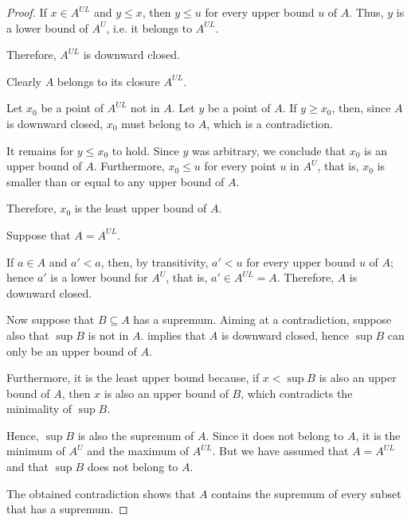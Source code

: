 \begin{proof}
   If \( x \in A^{UL} \) and \( y \leq x \), then \( y \leq u \) for every upper bound \( u \) of \( A \). Thus, \( y \) is a lower bound of \( A^U \), i.e. it belongs to \( A^{UL} \).

  Therefore, \( A^{UL} \) is downward closed.

   Clearly \( A \) belongs to its closure \( A^{UL} \).

  Let \( x_0 \) be a point of \( A^{UL} \) not in \( A \). Let \( y \) be a point of \( A \). If \( y \geq x_0 \), then, since \( A \) is downward closed, \( x_0 \) must belong to \( A \), which is a contradiction.

  It remains for \( y \leq x_0 \) to hold. Since \( y \) was arbitrary, we conclude that \( x_0 \) is an upper bound of \( A \). Furthermore, \( x_0 \leq u \) for every point \( u \) in \( A^U \), that is, \( x_0 \) is smaller than or equal to any upper bound of \( A \).

  Therefore, \( x_0 \) is the least upper bound of \( A \).

   Suppose that \( A = A^{UL} \).

  If \( a \in A \) and \( a' < a \), then, by transitivity, \( a' < u \) for every upper bound \( u \) of \( A \); hence \( a' \) is a lower bound for \( A^U \), that is, \( a' \in A^{UL} = A \). Therefore, \( A \) is downward closed.

  Now suppose that \( B \subseteq A \) has a supremum. Aiming at a contradiction, suppose also that \( \sup B \) is not in \( A \).  implies that \( A \) is downward closed, hence \( \sup B \) can only be an upper bound of \( A \).

  Furthermore, it is the least upper bound because, if \( x < \sup B \) is also an upper bound of \( A \), then \( x \) is also an upper bound of \( B \), which contradicts the minimality of \( \sup B \).

  Hence, \( \sup B \) is also the supremum of \( A \). Since it does not belong to \( A \), it is the minimum of \( A^U \) and the maximum of \( A^{UL} \). But we have assumed that \( A = A^{UL} \) and that \( \sup B \) does not belong to \( A \).

  The obtained contradiction shows that \( A \) contains the supremum of every subset that has a supremum.


\end{proof}
